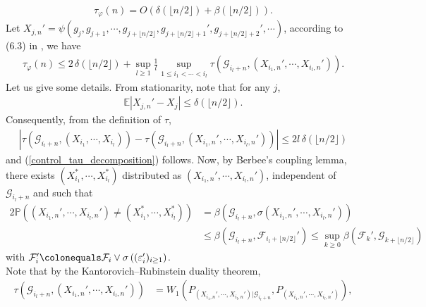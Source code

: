 \documentclass{ws-sd}
\newcommand{\E}{\mathbb{E}}
\newcommand{\Proba}{\mathbb{P}}
\newcommand{\calF}{\mathcal{F}}
\newcommand{\abs}[1]{\left\lvert #1 \right\rvert}
\newcommand{\eqdef}{\colonequals}
\newcommand\bigp[1]{\left(#1\right)}
\newcommand{\eps}{\varepsilon}
\begin{document}
    \begin{align}
            \label{control_tau_deltabeta}
        \tau_\varphi(n) = O(\delta(\lfloor n/2 \rfloor) + \beta(\lfloor n/2 \rfloor)).
    \end{align}
    Let $X_{j,n}' = \psi\left(g_j, g_{j+1}, \cdots, g_{j+\lfloor n/2 \rfloor}, g_{j+\lfloor n/2 \rfloor +1}', g_{j+\lfloor n/2 \rfloor +2}', \cdots\right)$, according to (6.3) in \cite{5}, we have
    \begin{align}
            \label{control_tau_decomposition}
        \tau_{\varphi}(n) \le 2\, \delta(\lfloor n/2 \rfloor) + \sup_{l \ge 1}\frac{1}{l}\sup_{1\le i_1<\cdots<i_l} \tau\bigp{\mathcal G_{i_l + n}, (X_{i_1,n}', \cdots, X_{i_l,n}')}.
    \end{align}
    Let us give some details.
    From stationarity, note that for any $j$,
    \begin{align*}
        \E \abs{X_{j,n}' - X_{j}} \le \delta(\lfloor n/2 \rfloor).
    \end{align*}
    Consequently, from the definition of $\tau$,
    \begin{align*}
        \abs{
            \tau(\mathcal G _{i_l+n},(X_{i_1}, \cdots, X_{i_l})) - \tau(\mathcal G _{i_l+n},(X_{i_1,n}', \cdots, X_{i_l,n}'))
        }
        \le
        2l\, \delta(\lfloor n/2 \rfloor)
    \end{align*}
    and (\ref{control_tau_decomposition}) follows.
    Now, by Berbee's coupling lemma, there exists $(X_{i_1}^*, \cdots, X_{i_l}^*)$ distributed as $(X_{i_1,n}', \cdots, X_{i_l,n}')$, independent of $\mathcal G _{i_l+n}$ and such that
    \begin{align*}
        2\Proba((X_{i_1,n}', \cdots, X_{i_l,n}') \neq (X_{i_1}^*, \cdots, X_{i_l}^*))
        &= \beta(\mathcal G _{i_l+n}, \sigma(X_{i_1,n}', \cdots, X_{i_l,n}'))
        \\&
        \le \beta(\mathcal G _{i_l+n}, \mathcal F_{i_l + \lfloor n/2 \rfloor}')
        \le \sup_{k \ge 0} \beta(\calF _k', \mathcal G _{k + \lfloor n/2 \rfloor})
    \end{align*}
    with $\calF_i' \eqdef \calF_i \vee \sigma\bigp{(\eps_i')_{i \ge 1}}$.
    \\
    Note that by the Kantorovich--Rubinstein duality theorem,
    \begin{align*}
        \tau\bigp{\mathcal G_{i_l + n}, (X_{i_1,n}', \cdots, X_{i_l,n}')}
        &=
        W_1 \bigp{P_{(X_{i_1,n}', \cdots, X_{i_l,n}')|\mathcal G_{i_l + n}}, P_{(X_{i_1,n}', \cdots, X_{i_l,n}')}},
    \end{align*}
\end{document}
